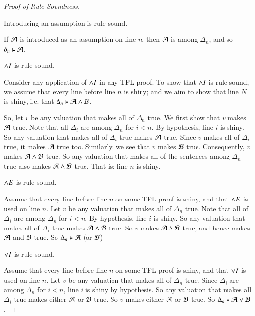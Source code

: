 \begin{proof}[Proof of Rule-Soundness]
    \begin{claim}[1]
        Introducing an assumption is rule-sound.
    \end{claim}
    If $\mathcal{A}$ is introduced as an assumption on line $n$, then $\mathcal{A}$ is among $\Delta_n$, and so $\delta_n \vDash \mathcal{A}$.

    \begin{claim}[2]
        $\wedge I$ is rule-sound.
    \end{claim}
    Consider any application of $\wedge I$ in any TFL-proof. To show that $\wedge I$ is rule-sound, we assume that every line before line $n$ is shiny; and we aim to show that line $N$ is shiny, i.e. that $\Delta_n \vDash \mathcal{A}\wedge \mathcal{B}$.

    So, let $v$ be any valuation that makes all of $\Delta_n$ true. We first show that $v$ makes $\mathcal{A}$ true. Note that all $\Delta_i$ are among $\Delta_n$ for $i< n$. By hypothesis, line $i$ is shiny. So any valuation that makes all of $\Delta_i$ true makes $\mathcal{A}$ true. Since $v$ makes all of $\Delta_i$ true, it makes $\mathcal{A}$ true too. Similarly, we see that $v$ makes $\mathcal{B}$ true. Consequently, $v$ makes $\mathcal{A} \wedge\mathcal{B}$ true. So any valuation that makes all of the sentences among $\Delta_n$ true also makes $\mathcal{A}\wedge\mathcal{B}$ true. That is: line $n$ is shiny.


    \begin{claim}[3]
        $\wedge E$ is rule-sound.
    \end{claim}
    Assume that every line before line $n$ on some TFL-proof is shiny, and that $\wedge E$ is used on line $n$. Let $v$ be any valuation that makes all of $\Delta_n$ true. Note that all of $\Delta_i$ are among $\Delta_n$ for $i < n$. By hypothesis, line $i$ is shiny. So any valuation that makes all of $\Delta_i$ true makes $\mathcal{A}\wedge\mathcal{B}$ true. So $v$ makes $\mathcal{A}\wedge \mathcal{B}$ true, and hence makes $\mathcal{A}$ and $\mathcal{B}$ true. So $\Delta_n\vDash \mathcal{A}$ (or $\mathcal{B}$)

    \begin{claim}[4]
        $\vee I$ is rule-sound.
    \end{claim}
    Assume that every line before line $n$ on some TFL-proof is shiny, and that $\vee I$ is used on line $n$. Let $v$ be any valuation that makes all of $\Delta_n$ true. Since $\Delta_i$ are among $\Delta_n$ for $i < n$, line $i$ is shiny by hypothesis. So any valuation that makes all $\Delta_i$ true makes either $\mathcal{A}$ or $\mathcal{B}$ true. So $v$ makes either $\mathcal{A}$ or $\mathcal{B}$ true. So $\Delta_n\vDash \mathcal{A}\vee\mathcal{B}$.
    


\end{proof}
